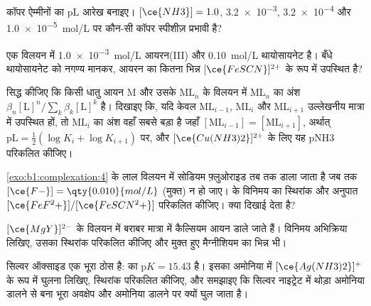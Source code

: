 \begin{exercise}[$\star$]\label{exo:b1:complexation:3}
कॉपर ऐम्मीनों का pL आरेख बनाइए। $[\ce{NH3}] = 1.0$, \num{3.2e-3}, \num{3.2e-4} और
\qty{1.0e-5}{mol/L} पर कौन-सी कॉपर स्पीशीज़
प्रभावी है?
\end{exercise}

\begin{exercise}[$\star$]\label{exo:b1:complexation:4}
एक विलयन में \qty{1.0e-3}{mol/L} आयरन(III) और
\qty{0.10}{mol/L} थायोसायनेट है। बँधे थायोसायनेट को नगण्य मानकर, आयरन का
कितना भिन्न $[\ce{FeSCN}]^{2+}$ के रूप में उपस्थित है?
\end{exercise}

\begin{exercise}[$\star\star$]\label{exo:b1:complexation:5}
सिद्ध कीजिए कि किसी धातु आयन M और उसके 
$\mathrm{ML}_n$ के विलयन में $\mathrm{ML}_n$ का अंश
$\beta_n[\mathrm{L}]^n / \sum_{k} \beta_k[\mathrm{L}]^k$ है। दिखाइए कि,
यदि केवल $\mathrm{ML}_{i-1}$, $\mathrm{ML}_i$ और $\mathrm{ML}_{i+1}$
उल्लेखनीय मात्रा में उपस्थित हों, तो $\mathrm{ML}_i$ का अंश
वहाँ सबसे बड़ा है जहाँ $[\mathrm{ML}_{i-1}] = [\mathrm{ML}_{i+1}]$, अर्थात्
$\mathrm{pL} = \frac12(\log K_i + \log K_{i+1})$ पर, और
$[\ce{Cu(NH3)2}]^{2+}$ के लिए यह pNH3 परिकलित कीजिए।
\end{exercise}

\begin{exercise}[$\star\star$]\label{exo:b1:complexation:6}
\cref{exo:b1:complexation:4} के लाल विलयन में सोडियम फ़्लुओराइड
तब तक डाला जाता है जब तक $[\ce{F-}] = \qty{0.010}{mol/L}$ (मुक्त) न हो जाए।  के
विनिमय का स्थिरांक और अनुपात $[\ce{FeF^2+}]/[\ce{FeSCN^2+}]$ परिकलित कीजिए।
क्या दिखाई देता है?
\end{exercise}

\begin{exercise}[$\star\star$]\label{exo:b1:complexation:7}
$[\ce{MgY}]^{2-}$ के विलयन में बराबर मात्रा में कैल्सियम आयन
डाले जाते हैं। विनिमय अभिक्रिया लिखिए, उसका स्थिरांक परिकलित कीजिए और
मुक्त हुए मैग्नीशियम का भिन्न भी।
\end{exercise}

\begin{exercise}[$\star\star$]\label{exo:b1:complexation:8}
सिल्वर ऑक्साइड  एक भूरा ठोस है: 
का $\mathrm{p}K = 15.43$ है। इसका अमोनिया में
$[\ce{Ag(NH3)2}]^{+}$ के रूप में घुलना लिखिए, स्थिरांक परिकलित कीजिए, और समझाइए कि
सिल्वर नाइट्रेट में थोड़ा अमोनिया डालने से बना भूरा
अवक्षेप और अमोनिया डालने पर क्यों घुल जाता है।
\end{exercise}

